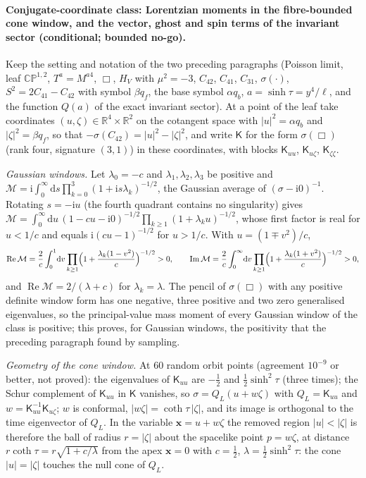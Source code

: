 \paragraph{Conjugate-coordinate class: Lorentzian moments in the fibre-bounded cone window, and the vector, ghost and spin terms of the invariant sector (conditional; bounded no-go).}
Keep the setting and notation of the two preceding paragraphs (Poisson limit, leaf \(\mathbb{CP}^{1,2}\), \(T^a=M^{a4}\), \(\Box\), \(H_V\) with \(\mu^2=-3\), \(C_{42}\), \(C_{41}\), \(C_{31}\), \(\sigma(\cdot)\), \(S^2=2C_{41}-C_{42}\) with symbol \(\beta q_f\), the base symbol \(\alpha q_b\), \(a=\sinh\tau=y^4/\ell\), and the function \(Q(a)\) of the exact invariant sector). At a point of the leaf take coordinates \((u,\zeta)\in\mathbb R^4\times\mathbb R^2\) on the cotangent space with \(|u|^2=\alpha q_b\) and \(|\zeta|^2=\beta q_f\), so that \(-\sigma(C_{42})=|u|^2-|\zeta|^2\), and write \(\mathsf K\) for the form \(\sigma(\Box)\) (rank four, signature \((3,1)\)) in these coordinates, with blocks \(\mathsf K_{uu}\), \(\mathsf K_{u\zeta}\), \(\mathsf K_{\zeta\zeta}\).

\emph{Gaussian windows.} Let \(\lambda_0=-c\) and \(\lambda_1,\lambda_2,\lambda_3\) be positive and \(\mathcal M=\mathrm i\int_0^\infty\mathrm ds\prod_{k=0}^3(1+\mathrm is\lambda_k)^{-1/2}\), the Gaussian average of \((\sigma-\mathrm i0)^{-1}\). Rotating \(s=-\mathrm iu\) (the fourth quadrant contains no singularity) gives \(\mathcal M=\int_0^\infty\mathrm du\,(1-cu-\mathrm i0)^{-1/2}\prod_{k\ge1}(1+\lambda_ku)^{-1/2}\), whose first factor is real for \(u<1/c\) and equals \(\mathrm i(cu-1)^{-1/2}\) for \(u>1/c\). With \(u=(1\mp v^2)/c\),
\[
  \operatorname{Re}\mathcal M=\frac2c\int_0^1\!\mathrm dv\prod_{k\ge1}\Bigl(1+\frac{\lambda_k(1-v^2)}c\Bigr)^{-1/2}>0,\qquad
  \operatorname{Im}\mathcal M=\frac2c\int_0^\infty\!\mathrm dv\prod_{k\ge1}\Bigl(1+\frac{\lambda_k(1+v^2)}c\Bigr)^{-1/2}>0 ,
\]
and \(\operatorname{Re}\mathcal M=2/(\lambda+c)\) for \(\lambda_k=\lambda\). The pencil of \(\sigma(\Box)\) with any positive definite window form has one negative, three positive and two zero generalised eigenvalues, so the principal-value mass moment of every Gaussian window of the class is positive; this proves, for Gaussian windows, the positivity that the preceding paragraph found by sampling.

\emph{Geometry of the cone window.} At \(60\) random orbit points (agreement \(10^{-9}\) or better, not proved): the eigenvalues of \(\mathsf K_{uu}\) are \(-\tfrac12\) and \(\tfrac12\sinh^2\tau\) (three times); the Schur complement of \(\mathsf K_{uu}\) in \(\mathsf K\) vanishes, so \(\sigma=Q_L(u+w\zeta)\) with \(Q_L=\mathsf K_{uu}\) and \(w=\mathsf K_{uu}^{-1}\mathsf K_{u\zeta}\); \(w\) is conformal, \(|w\zeta|=\coth\tau\,|\zeta|\), and its image is orthogonal to the time eigenvector of \(Q_L\). In the variable \(\boldsymbol x=u+w\zeta\) the removed region \(|u|<|\zeta|\) is therefore the ball of radius \(r=|\zeta|\) about the spacelike point \(p=w\zeta\), at distance \(r\coth\tau=r\sqrt{1+c/\lambda}\) from the apex \(\boldsymbol x=0\) with \(c=\tfrac12\), \(\lambda=\tfrac12\sinh^2\tau\): the cone \(|u|=|\zeta|\) touches the null cone of \(Q_L\).

